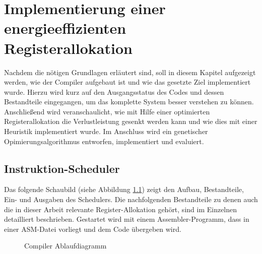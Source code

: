 \chapter{Implementierung einer energieeffizienten Registerallokation}
\label{chap:Implementierung}
Nachdem die nötigen Grundlagen erläutert sind, soll in diesem Kapitel aufgezeigt werden, wie der Compiler aufgebaut ist und wie das gesetzte Ziel implementiert wurde. Hierzu wird kurz auf den Ausgangsstatus des Codes und dessen Bestandteile eingegangen, um das komplette System besser verstehen zu können. Anschließend wird veranschaulicht, wie mit Hilfe einer optimierten Registerallokation die Verlustleistung gesenkt werden kann und wie dies mit einer Heuristik implementiert wurde. Im Anschluss wird ein genetischer Opimierungsalgorithmus entworfen, implementiert und evaluiert.
\newpage
\section{Instruktion-Scheduler}
 Das folgende Schaubild (siehe Abbildung \ref{fig:flow_compiler}) zeigt den Aufbau, Bestandteile, Ein- und Ausgaben des Schedulers. Die nachfolgenden Bestandteile zu denen auch die in dieser Arbeit relevante Register-Allokation gehört, sind im Einzelnen detailliert beschrieben.
 Gestartet wird mit einem Assembler-Programm, dass in einer ASM-Datei vorliegt und dem Code übergeben wird.
 
 
%			


	\begin{figure}[H] 
		\centering
		
		\caption{Compiler Ablaufdiagramm}
		\label{fig:flow_compiler}
	\end{figure}

